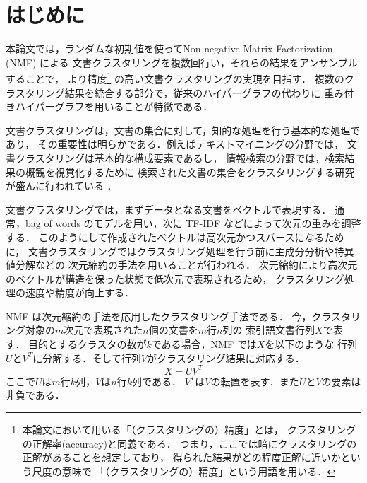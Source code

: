 \documentclass[japanese]{jnlp_1.3e}
\begin{document}
\maketitle


\section{はじめに}


本論文では，ランダムな初期値を使ってNon-negative Matrix Factorization (NMF) による
文書クラスタリングを複数回行い，それらの結果をアンサンブルすることで，
より精度\footnote{本論文において用いる「（クラスタリングの）精度」とは，
クラスタリングの正解率(accuracy)と同義である．
つまり，ここでは暗にクラスタリングの正解があることを想定しており，
得られた結果がどの程度正解に近いかという尺度の意味で
「（クラスタリングの）精度」という用語を用いる．}
の高い文書クラスタリングの実現を目指す．
複数のクラスタリング結果を統合する部分で，従来のハイパーグラフの代わりに
重み付きハイパーグラフを用いることが特徴である．

文書クラスタリングは，文書の集合に対して，知的な処理を行う基本的な処理であり，
その重要性は明らかである．例えばテキストマイニングの分野では，
文書クラスタリングは基本的な構成要素であるし\cite{TextMiningBook}，
情報検索の分野では，検索結果の概観を視覚化するために
検索された文書の集合をクラスタリングする研究が盛んに行われている
\cite{hearst96reexamining}\cite{leuski01evaluating}\cite{zeng-learning}\cite{kummamuruwww2004}．

文書クラスタリングでは，まずデータとなる文書をベクトルで表現する．
通常，bag of words のモデルを用い，次に TF-IDF などによって次元の重みを調整する．
このようにして作成されたベクトルは高次元かつスパースになるために，
文書クラスタリングではクラスタリング処理を行う前に主成分分析や特異値分解などの
次元縮約の手法を用いることが行われる\cite{boley99document}\cite{deerwester90indexing}．
次元縮約により高次元のベクトルが構造を保った状態で低次元で表現されるため，
クラスタリング処理の速度や精度が向上する．

NMF は次元縮約の手法を応用したクラスタリング手法である\cite{nmf}．
今，クラスタリング対象の\( m \)次元で表現された\( n \)個の文書を\( m \)行\( n \)列の
索引語文書行列\( X \)で表す．
目的とするクラスタの数が\( k \)である場合，NMF では\( X \)を以下のような
行列\( U \)と\( V^{T} \)に分解する．そして行列\( V \)がクラスタリング結果に対応する．
\[
X = U V^{T}    
\]
ここで\( U \)は\( m \)行\( k \)列，\( V \)は\( n \)行\( k \)列である．
\( V^{T} \)は\( V \)の転置を表す．また\( U \)と\( V \)の要素は非負である．
\end{document}
